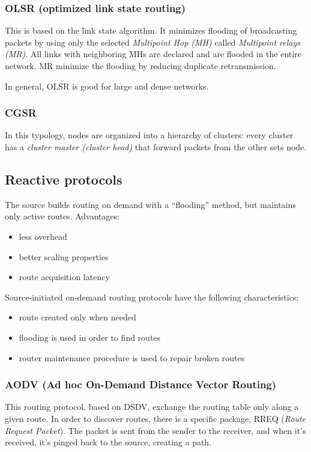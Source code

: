 \subsubsection{OLSR (optimized link state routing)}

This is based on the link state algorithm. It minimizes flooding of broadcasting
packets by using only the selected \textit{Multipoint Hop (MH)} called
\textit{Multipoint relays (MR)}. All links with neighboring MHs are declared and
are flooded in the entire network. MR minimize the flooding by reducing
duplicate retransmission.

In general, OLSR is good for large and dense networks.

\subsubsection{CGSR}

In this typology, nodes are organized into a hierarchy of clusters: every
cluster has a \textit{cluster master (cluster head)} that forward packets from
the other sets node.

\subsection{Reactive protocols}
The source builds routing on demand with a ``flooding'' method, but maintains
only active routes.
Advantages:
\begin{itemize}
\item less overhead
\item better scaling properties
\item route acquisition latency
\end{itemize}

Source-initiated on-demand routing protocols have the following characteristics:
\begin{itemize}
\item route created only when needed
\item flooding is used in order to find routes
\item router maintenance procedure is used to repair broken routes
\end{itemize}

\subsubsection{AODV (Ad hoc On-Demand Distance Vector Routing)}

This routing protocol, based on DSDV, exchange the routing table only along a
given route. In order to discover routes, there is a specific package, RREQ
(\textit{Route Request Packet}). The packet is sent from the sender to the
receiver, and when it's received, it's pinged back to the source, creating a
path.

